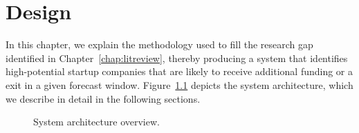 \documentclass[../thesis/thesis.tex]{subfiles}
\begin{document}
\chapter{Design}
\label{chap:design}


In this chapter, we explain the methodology used to fill the research gap identified in Chapter~\ref{chap:litreview}, thereby producing a system that identifies high-potential startup companies that are likely to receive additional funding or a exit in a given forecast window. Figure~\ref{fig:design:system_architecture} depicts the system architecture, which we describe in detail in the following sections.

\begin{figure}[!htb]
    \centering
    \caption{System architecture overview.}
    \label{fig:design:system_architecture}
\end{figure}
\end{document}
